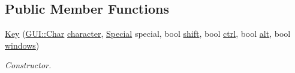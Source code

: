 \subsection*{Public Member Functions}
\begin{DoxyCompactItemize}
\item 
\hypertarget{classGUI_1_1Key_a31595e9fe0e454d7377a6f3fe5556f2d}{\hyperlink{classGUI_1_1Key_a31595e9fe0e454d7377a6f3fe5556f2d}{Key} (\hyperlink{namespaceGUI_af6b04b46d40197b4f00e553d7d1a3e4c}{G\-U\-I\-::\-Char} \hyperlink{classGUI_1_1Key_a08e3432cc2bc3ceded36c3405fca4353}{character}, \hyperlink{classGUI_1_1Key_a9d3f8dbfc08f0189dbb8aa5a20b9ea99}{Special} special, bool \hyperlink{classGUI_1_1Key_a1d5e7cc9901d4a4de7bb735da176aef1}{shift}, bool \hyperlink{classGUI_1_1Key_a1f76abf9d09f4058ab21fde120958ee3}{ctrl}, bool \hyperlink{classGUI_1_1Key_a717d049af03dea6f7fafd58dd3160ebe}{alt}, bool \hyperlink{classGUI_1_1Key_abc017c8f165f2b4c857c757ef413da3c}{windows})}\label{classGUI_1_1Key_a31595e9fe0e454d7377a6f3fe5556f2d}

\begin{DoxyCompactList}\small\item\em Constructor. \end{DoxyCompactList}\end{DoxyCompactItemize}
